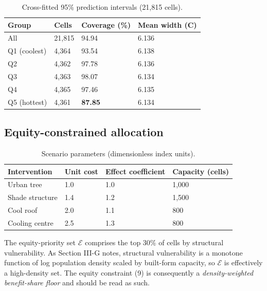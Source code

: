 \documentclass[conference]{IEEEtran}
\begin{document}
\begin{table}[!t]
\caption{Cross-fitted 95\% prediction intervals (21,815 cells).}
\label{tab:4}
\centering
\footnotesize
\begin{tabular}{@{}llll@{}}
\toprule\noalign{}
Group & Cells & Coverage (\%) & Mean width (\textdegree{}C) \\
\midrule\noalign{}
All & 21,815 & 94.94 & 6.136 \\
Q1 (coolest) & 4,364 & 93.54 & 6.138 \\
Q2 & 4,362 & 97.78 & 6.136 \\
Q3 & 4,363 & 98.07 & 6.134 \\
Q4 & 4,365 & 97.46 & 6.135 \\
Q5 (hottest) & 4,361 & \textbf{87.85} & 6.134 \\
\end{tabular}
\end{table}


\subsection{Equity-constrained allocation}\label{e.-equity-constrained-allocation}

\begin{table}[!t]
\caption{Scenario parameters (dimensionless index units).}
\label{tab:5}
\centering
\footnotesize
\begin{tabular}{@{}llll@{}}
\toprule\noalign{}
Intervention & Unit cost & Effect coefficient & Capacity (cells) \\
\midrule\noalign{}
Urban tree & 1.0 & 1.0 & 1,000 \\
Shade structure & 1.4 & 1.2 & 1,500 \\
Cool roof & 2.0 & 1.1 & 800 \\
Cooling centre & 2.5 & 1.3 & 800 \\
\end{tabular}
\end{table}


The equity-priority set \(\mathcal{E}\) comprises the top 30\% of cells by structural vulnerability. As
Section III-G notes, structural vulnerability is a monotone function of log population density scaled
by built-form capacity, so \(\mathcal{E}\) is effectively a high-density set. The equity constraint (9)
is consequently a \emph{density-weighted benefit-share floor} and should be read as such.
\end{document}
